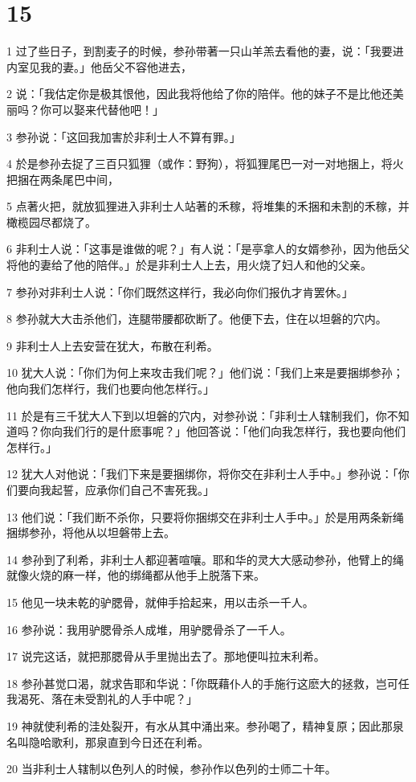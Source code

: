 \chapter{15}

\par 1 过了些日子，到割麦子的时候，参孙带著一只山羊羔去看他的妻，说：「我要进内室见我的妻。」他岳父不容他进去，
\par 2 说：「我估定你是极其恨他，因此我将他给了你的陪伴。他的妹子不是比他还美丽吗？你可以娶来代替他吧！」
\par 3 参孙说：「这回我加害於非利士人不算有罪。」
\par 4 於是参孙去捉了三百只狐狸（或作：野狗），将狐狸尾巴一对一对地捆上，将火把捆在两条尾巴中间，
\par 5 点著火把，就放狐狸进入非利士人站著的禾稼，将堆集的禾捆和未割的禾稼，并橄榄园尽都烧了。
\par 6 非利士人说：「这事是谁做的呢？」有人说：「是亭拿人的女婿参孙，因为他岳父将他的妻给了他的陪伴。」於是非利士人上去，用火烧了妇人和他的父亲。
\par 7 参孙对非利士人说：「你们既然这样行，我必向你们报仇才肯罢休。」
\par 8 参孙就大大击杀他们，连腿带腰都砍断了。他便下去，住在以坦磐的穴内。
\par 9 非利士人上去安营在犹大，布散在利希。
\par 10 犹大人说：「你们为何上来攻击我们呢？」他们说：「我们上来是要捆绑参孙；他向我们怎样行，我们也要向他怎样行。」
\par 11 於是有三千犹大人下到以坦磐的穴内，对参孙说：「非利士人辖制我们，你不知道吗？你向我们行的是什麽事呢？」他回答说：「他们向我怎样行，我也要向他们怎样行。」
\par 12 犹大人对他说：「我们下来是要捆绑你，将你交在非利士人手中。」参孙说：「你们要向我起誓，应承你们自己不害死我。」
\par 13 他们说：「我们断不杀你，只要将你捆绑交在非利士人手中。」於是用两条新绳捆绑参孙，将他从以坦磐带上去。
\par 14 参孙到了利希，非利士人都迎著喧嚷。耶和华的灵大大感动参孙，他臂上的绳就像火烧的麻一样，他的绑绳都从他手上脱落下来。
\par 15 他见一块未乾的驴腮骨，就伸手拾起来，用以击杀一千人。
\par 16 参孙说：我用驴腮骨杀人成堆，用驴腮骨杀了一千人。
\par 17 说完这话，就把那腮骨从手里抛出去了。那地便叫拉末利希。
\par 18 参孙甚觉口渴，就求告耶和华说：「你既藉仆人的手施行这麽大的拯救，岂可任我渴死、落在未受割礼的人手中呢？」
\par 19 神就使利希的洼处裂开，有水从其中涌出来。参孙喝了，精神复原；因此那泉名叫隐哈歌利，那泉直到今日还在利希。
\par 20 当非利士人辖制以色列人的时候，参孙作以色列的士师二十年。

